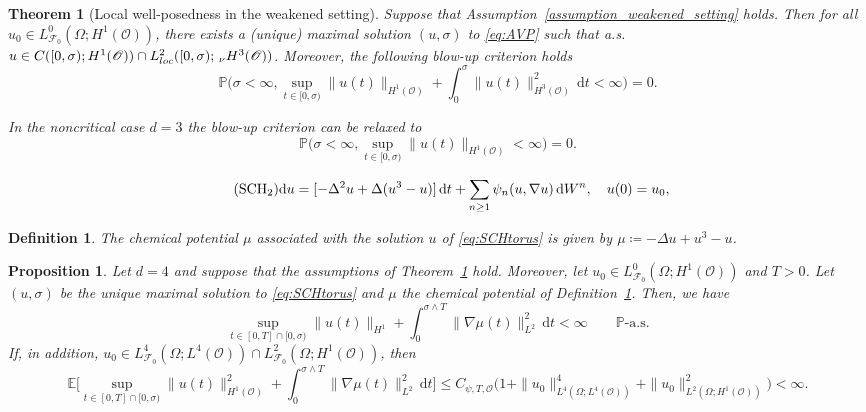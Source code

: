 \documentclass[10pt,a4paper]{amsart}
\newtheorem{theorem}{Theorem}
\newtheorem{definition}{Definition}
\newtheorem{proposition}{Proposition}
\newcommand{\E}{\mathbb{E}}
\newcommand{\F}{\mathscr{F}}
\renewcommand{\P}{\mathbb{P}}
\newcommand{\ce}{\coloneqq}
\newcommand{\dt}{\,\mathrm{d}t}
\newcommand{\grad}{\nabla}
\newcommand{\loc}{\textup{loc}}
\newcommand{\nH}{\ensuremath{\,_\nu H}}
\newcommand{\rmd}{\mathrm{d}}
\newcommand{\sO}{\mathscr{O}}
\begin{document}
\begin{theorem}[Local well-posedness in the weakened setting] \label{thm:localWP_weakened}
Suppose that Assumption~\ref{assumption_weakened_setting} holds. Then for all $u_0\in L^0_{\F_0}(\Omega;H^1(\sO))$, there exists a (unique) maximal solution $(u,\sigma)$ to \eqref{eq:AVP} such that a.s.\ $u\in C([0,\sigma);H^1(\sO))\cap L^2_{\loc}([0,\sigma);\nH^3(\sO))$. Moreover, the following blow-up criterion holds
\begin{equation}
    \label{eq:blowUp_bare}
    \P \bigg(\sigma < \infty ,\sup\limits_{t\in [0,\sigma)} \| u(t) \|_{H^1(\sO)} + \int_0^\sigma \|u(t) \|^2_{H^3(\sO)} \dt<\infty  \bigg) =0.
\end{equation}

In the noncritical case $d=3$ the blow-up criterion can be relaxed to 
\begin{equation}
    \label{eq:blowUpSubcritd3}
    \P \bigg(\sigma < \infty ,\sup\limits_{t\in [0,\sigma)} \| u(t) \|_{H^1(\sO)} <\infty  \bigg) =0.
\end{equation}
\end{theorem}

\begin{equation}\tag{$\text{SCH}_2$}
\label{eq:SCHtorus}
    \rmd u = [-\Delta^2u+\Delta(u^3-u)
    ]\dt + \sum_{n \geq 1} \psi_n(u,\grad u)\,\rmd W^n,\quad u(0)=u_0,
\end{equation}

    \begin{definition}\label{def:chemPotential}
    The \emph{chemical potential} $\mu$ associated with the solution $u$ of
\eqref{eq:SCHtorus} is given by $\mu\ce -\Delta u+u^3-u$.
    \end{definition}

\begin{proposition} \label{prop:global_well_posedness_dim_4-part1}
	Let $d=4$ and suppose that the assumptions of Theorem~\ref{thm:localWP_weakened} hold. Moreover, let $u_0\in L^0_{\F_0}(\Omega;H^1(\sO))$ and $T>0$. Let $(u,\sigma)$ be the unique maximal solution to \eqref{eq:SCHtorus} and $\mu$ the chemical potential of Definition~\ref{def:chemPotential}. Then, we have
	\begin{equation}\label{eq:prop-global_well_posedness_dim_4-claim1}
	       \sup_{t\in[0,T]\cap [0,\sigma)}\|u(t)\|_{H^1}+\int_0^{\sigma \land T} \|\grad \mu(t)\|_{L^2}^2 \dt < \infty  \qquad \mathbb{P}\text{-a.s.}
	\end{equation}
	If, in addition, $u_0\in L_{\F_0}^4(\Omega;L^4(\sO))\cap L_{\F_0}^2(\Omega;H^1(\sO))$, then
    \begin{equation}\label{eq:prop-global_well_posedness_dim_4-claim2}
    \E\bigg[\sup_{t\in[0,T]\cap[0,\sigma)}  \|u(t)\|^2_{H^1(\sO)} + \int_0^{\sigma \land T} \|\grad \mu(t)\|_{L^2}^2 \dt \bigg] \le C_{\psi,T,\sO}\big(1+\|u_0\|^4_{L^4(\Omega;L^4(\sO))}+\|u_0\|^2_{L^2(\Omega;H^1(\sO))}\big) < \infty.
    \end{equation}
\end{proposition}
\end{document}
